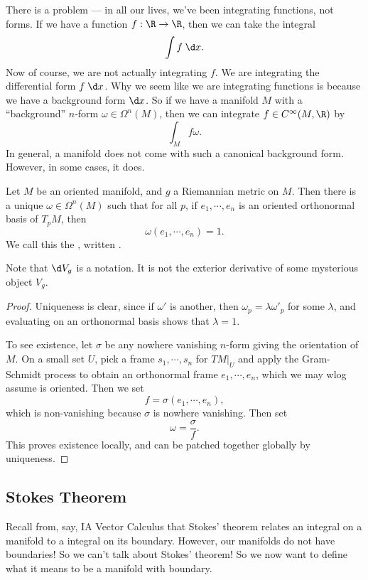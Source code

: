 \documentclass[a4paper]{article}
\begin{document}
There is a problem --- in all our lives, we've been integrating functions, not forms. If we have a function $f: \R \to \R$, then we can take the integral
\[
  \int f\;\d x.
\]
Now of course, we are not actually integrating $f$. We are integrating the differential form $f\;\d x$. Why we seem like we are integrating functions is because we have a background form $\d x$. So if we have a manifold $M$ with a ``background'' $n$-form $\omega \in \Omega^n (M)$, then we can integrate $f \in C^\infty(M, \R)$ by
\[
  \int_M f \omega.
\]
In general, a manifold does not come with such a canonical background form. However, in some cases, it does.
\begin{lemma}
  Let $M$ be an oriented manifold, and $g$ a Riemannian metric on $M$. Then there is a unique $\omega \in \Omega^n(M)$ such that for all $p$, if $e_1, \cdots, e_n$ is an oriented orthonormal basis of $T_pM$, then
  \[
    \omega(e_1, \cdots, e_n) = 1.
  \]
  We call this the , written .
\end{lemma}
Note that $\d V_g$ is a notation. It is not the exterior derivative of some mysterious object $V_g$.

\begin{proof}
  Uniqueness is clear, since if $\omega'$ is another, then $\omega_p = \lambda \omega'_p$ for some $\lambda$, and evaluating on an orthonormal basis shows that $\lambda = 1$.

  To see existence, let $\sigma$ be any nowhere vanishing $n$-form giving the orientation of $M$. On a small set $U$, pick a frame $s_1, \cdots, s_n$ for $TM|_U$ and apply the Gram-Schmidt process to obtain an orthonormal frame $e_1, \cdots, e_n$, which we may wlog assume is oriented. Then we set
  \[
    f = \sigma(e_1, \cdots, e_n),
  \]
  which is non-vanishing because $\sigma$ is nowhere vanishing. Then set
  \[
    \omega = \frac{\sigma}{f}.
  \]
  This proves existence locally, and can be patched together globally by uniqueness.
\end{proof}
\subsection{Stokes Theorem}
Recall from, say, IA Vector Calculus that Stokes' theorem relates an integral on a manifold to a integral on its boundary. However, our manifolds do not have boundaries! So we can't talk about Stokes' theorem! So we now want to define what it means to be a manifold with boundary.
\end{document}

